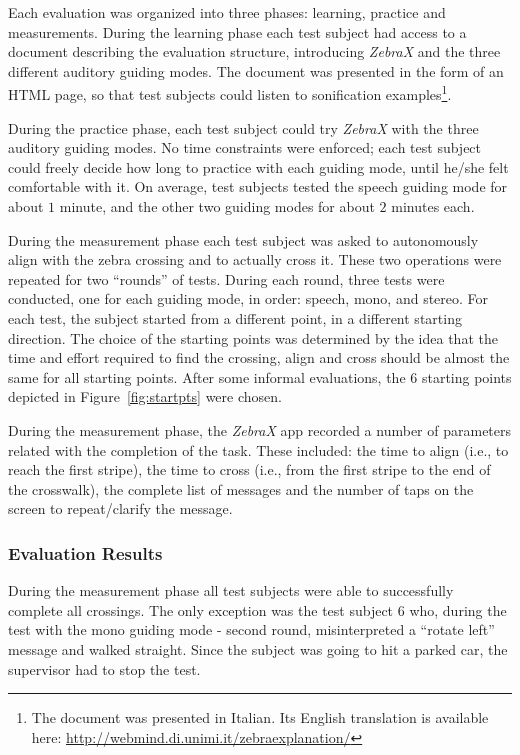 \documentclass{article}
\newcommand{\zebra}{\emph{ZebraX}}
\begin{document}
Each evaluation was organized into three phases: learning, practice and measurements.
During the learning phase each test subject had access to a document describing the evaluation structure,
introducing \zebra{} and the three different auditory guiding modes.
The document was presented in the form of an HTML page, so that test subjects could listen to sonification examples\footnote{The document was presented in Italian. Its English translation is available here: \url{http://webmind.di.unimi.it/zebraexplanation/}}.

During the practice phase, each test subject could try \zebra{} with the three auditory guiding modes.
No time constraints were enforced; each test subject could freely decide how long to practice with each guiding mode, until he/she felt comfortable with it. On average, test subjects tested the speech guiding mode for about $1$ minute, and the other two guiding modes for about $2$ minutes each.

During the measurement phase each test subject was asked to autonomously align with the zebra crossing and to actually cross it.
These two operations were repeated for two ``rounds'' of tests. During each round, three tests were conducted, one for each guiding mode, in order: speech, mono, and stereo.
For each test, the subject started from a different point, in a different starting direction.
The choice of the starting points was determined by the idea that the time and effort required to find the crossing, align and cross should be almost the same for all starting points. After some informal evaluations, the $6$ starting points depicted in Figure~\ref{fig:startpts} were chosen.

During the measurement phase, the \zebra{} app recorded a number of parameters related with the completion of the task. These included: the time to align (i.e., to reach the first stripe), the time to cross (i.e., from the first stripe to the end of the crosswalk), the complete list of messages and the number of taps on the screen to repeat/clarify the message.

\subsubsection{Evaluation Results}
\label{sub:quantitativeResults}
During the measurement phase all test subjects were able to successfully complete all crossings. The only exception was the test subject $6$ who, during the test with the mono guiding mode - second round, misinterpreted a ``rotate left'' message and walked straight. Since the subject was going to hit a parked car, the supervisor had to stop the test.
\end{document}
